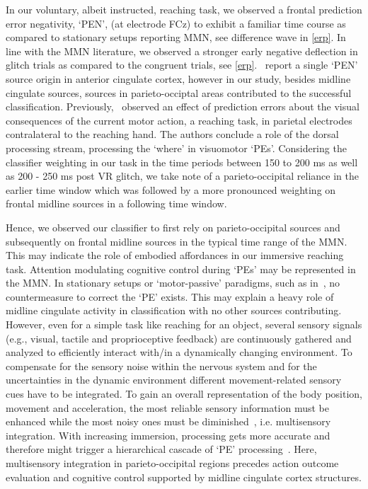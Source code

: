 In our voluntary, albeit instructed, reaching task, we observed a frontal prediction error negativity, `PEN', (at electrode FCz) to exhibit a familiar time course as compared to stationary setups reporting MMN, see difference wave in \ref{erp}. In line with the MMN literature, we observed a stronger early negative deflection in glitch trials as compared to the congruent trials, see \ref{erp}.~\citet{Zander2016-ed} report a single `PEN' source origin in anterior cingulate cortex, however in our study, besides midline cingulate sources, sources in parieto-occiptal areas contributed to the successful classification. Previously,~\citet{Savoie2018-ad} observed an effect of prediction errors about the visual consequences of the current motor action, a reaching task, in parietal electrodes contralateral to the reaching hand. The authors conclude a role of the dorsal processing stream, processing the `where' in visuomotor `PEs'. Considering the classifier weighting in our task in the time periods between 150 to 200 ms as well as 200 - 250 ms post VR glitch, we take note of a parieto-occipital reliance in the earlier time window which was followed by a more pronounced weighting on frontal midline sources in a following time window.

Hence, we observed our classifier to first rely on parieto-occipital sources and subsequently on frontal midline sources in the typical time range of the MMN. This may indicate the role of embodied affordances in our immersive reaching task. Attention modulating cognitive control during `PEs' may be represented in the MMN. In stationary setups or `motor-passive' paradigms, such as in~\citet{Zander2016-ed}, no countermeasure to correct the `PE' exists. This may explain a heavy role of midline cingulate activity in classification with no other sources contributing. However, even for a simple task like reaching for an object, several sensory signals (e.g., visual, tactile and proprioceptive feedback) are continuously gathered and analyzed to efficiently interact with/in a dynamically changing environment. To compensate for the sensory noise within the nervous system and for the uncertainties in the dynamic environment different movement-related sensory cues have to be integrated. To gain an overall representation of the body position, movement and acceleration, the most reliable sensory information must be enhanced while the most noisy ones must be diminished~\cite{Fetsch2011-bp}, i.e. multisensory integration. With increasing immersion, processing gets more accurate and therefore might trigger a hierarchical cascade of `PE' processing~\cite{Singh2021-qc}. Here, multisensory integration in parieto-occipital regions precedes action outcome evaluation and cognitive control supported by midline cingulate cortex structures. 

